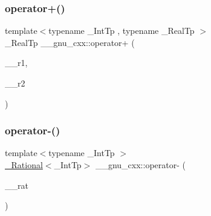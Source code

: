 \subsubsection{\texorpdfstring{operator+()}{operator+()}\hspace{0.1cm}{\footnotesize\ttfamily [4/4]}}
{\footnotesize\ttfamily template$<$typename \+\_\+\+Int\+Tp , typename \+\_\+\+Real\+Tp $>$ \\
\+\_\+\+Real\+Tp \+\_\+\+\_\+gnu\+\_\+cxx\+::operator+ (\begin{DoxyParamCaption}\item[{const \hyperlink{class____gnu__cxx_1_1__Rational}{\+\_\+\+Rational}$<$ \+\_\+\+Int\+Tp $>$ \&}]{\+\_\+\+\_\+r1,  }\item[{\+\_\+\+Real\+Tp}]{\+\_\+\+\_\+r2 }\end{DoxyParamCaption})}

\mbox{\label{namespace____gnu__cxx_a955551042422a27cef4a20d46002acab}} 
\subsubsection{\texorpdfstring{operator-\/()}{operator-()}\hspace{0.1cm}{\footnotesize\ttfamily [1/4]}}
{\footnotesize\ttfamily template$<$typename \+\_\+\+Int\+Tp $>$ \\
\hyperlink{class____gnu__cxx_1_1__Rational}{\+\_\+\+Rational}$<$\+\_\+\+Int\+Tp$>$ \+\_\+\+\_\+gnu\+\_\+cxx\+::operator-\/ (\begin{DoxyParamCaption}\item[{const \hyperlink{class____gnu__cxx_1_1__Rational}{\+\_\+\+Rational}$<$ \+\_\+\+Int\+Tp $>$ \&}]{\+\_\+\+\_\+rat }\end{DoxyParamCaption})\hspace{0.3cm}{\ttfamily [inline]}}

\mbox{\label{namespace____gnu__cxx_a9673a1f36bec838a08869eb91f2956ba}} 
